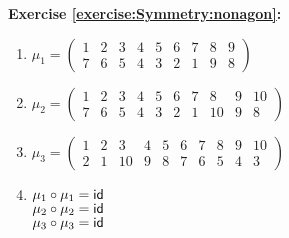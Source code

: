 \noindent\textbf{Exercise \ref{exercise:Symmetry:nonagon}:}
\begin{enumerate}[{a.}]
\item 
%
$\mu_1 = \begin{pmatrix} 1 & 2 & 3 & 4 & 5 & 6 & 7 & 8 & 9 \\ 7 & 6 & 5 & 4 & 3 & 2 & 1 & 9 & 8   \end{pmatrix}$

\item
%
$\mu_2 = \begin{pmatrix} 1 & 2 & 3 & 4 & 5 & 6 & 7 & 8 & 9 & 10  \\ 7 & 6 & 5 & 4 & 3 & 2 & 1 & 10 & 9 & 8 \end{pmatrix}$

\item 
%
$\mu_3 = \begin{pmatrix} 1 & 2 & 3 & 4 & 5 & 6 & 7 & 8 & 9 & 10 \\ 2 & 1 & 10 & 9 & 8 & 7 & 6 & 5 & 4 & 3\end{pmatrix}$

\item
$\mu_1\circ\mu_1 = \sf{id}$\\
$\mu_2\circ\mu_2 = \sf{id}$\\
$\mu_3\circ\mu_3 = \sf{id}$
\end{enumerate}


